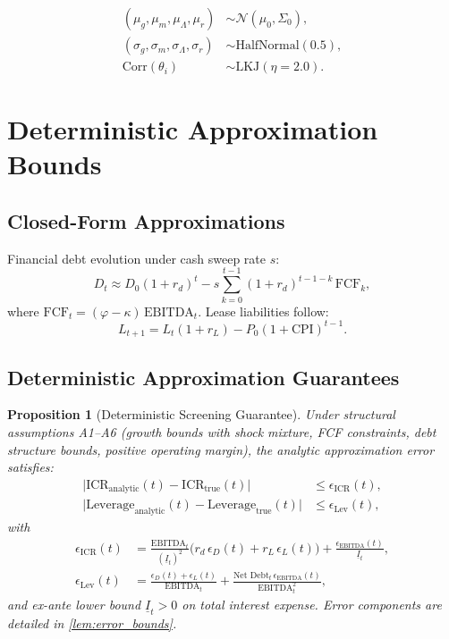 \documentclass[11pt,a4paper]{article}
\theoremstyle{plain}
\newtheorem{proposition}{Proposition}
\theoremstyle{definition}
\newcommand{\cref}[1]{\ref{#1}}
\begin{document}
\begin{align}
(\mu_g,\mu_m,\mu_\Lambda,\mu_r) &\sim \mathcal{N}(\mu_0,\Sigma_0), \\
(\sigma_g,\sigma_m,\sigma_\Lambda,\sigma_r) &\sim \text{HalfNormal}(0.5), \\
\text{Corr}(\theta_i) &\sim \text{LKJ}(\eta=2.0).
\end{align}

\section{Deterministic Approximation Bounds}

\subsection{Closed-Form Approximations}

Financial debt evolution under cash sweep rate $s$:
\begin{equation}
D_t \approx D_0(1+r_d)^t - s \sum_{k=0}^{t-1} (1+r_d)^{t-1-k}\,\text{FCF}_k,
\end{equation}
where $\text{FCF}_t = (\varphi-\kappa)\,\text{EBITDA}_t$. Lease liabilities follow:
\begin{equation}
L_{t+1} = L_t(1+r_L) - P_0(1+\text{CPI})^{t-1}.
\end{equation}

\subsection{Deterministic Approximation Guarantees}

\begin{proposition}[Deterministic Screening Guarantee]\label{prop:screening}
Under structural assumptions A1--A6 (growth bounds with shock mixture, FCF constraints, debt structure bounds, positive operating margin), the analytic approximation error satisfies:
\begin{align}
\bigl|\text{ICR}_{\text{analytic}}(t) - \text{ICR}_{\text{true}}(t)\bigr| &\le \epsilon_{\text{ICR}}(t), \\
\bigl|\text{Leverage}_{\text{analytic}}(t) - \text{Leverage}_{\text{true}}(t)\bigr| &\le \epsilon_{\text{Lev}}(t),
\end{align}
with
\begin{align}
\epsilon_{\text{ICR}}(t) &= \frac{\text{EBITDA}_t}{(\underline{I}_t)^2}\bigl(r_d\,\epsilon_D(t)+r_L\,\epsilon_L(t)\bigr) + \frac{\epsilon_{\text{EBITDA}}(t)}{\underline{I}_t}, \\
\epsilon_{\text{Lev}}(t) &= \frac{\epsilon_D(t)+\epsilon_L(t)}{\text{EBITDA}_t} + \frac{\text{Net Debt}_t\,\epsilon_{\text{EBITDA}}(t)}{\text{EBITDA}_t^2},
\end{align}
and ex-ante lower bound $\underline{I}_t>0$ on total interest expense. Error components are detailed in \cref{lem:error_bounds}.
\end{proposition}
\end{document}
